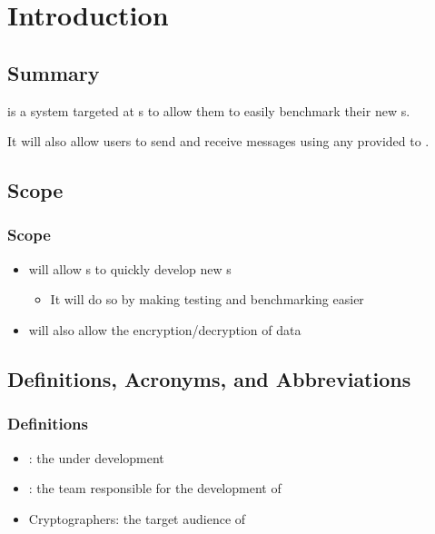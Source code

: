 
\section{Introduction}


\subsection{Summary}

\begin{frame}
  \cry{} is a system targeted at \cg s to allow them to
  easily benchmark their new \cs{} s.

  It will also allow users to send and receive messages
  using any \cs{} provided to \cry{}.
\end{frame}


\subsection{Scope}

\begin{frame}
\frametitle{Scope}
\begin{itemize}
\item \cry{} will allow \cg s to quickly develop new \cs{}s
\begin{itemize}
  \item It will do so by making testing and benchmarking
  easier
\end{itemize}
\item \cry{} will also allow the encryption/decryption of
data
\end{itemize}
\end{frame}


\subsection{Definitions, Acronyms, and Abbreviations}

\begin{frame}
\frametitle{Definitions}
\begin{itemize}
\item \cry{}: the \cf{} under development
\item \tc{}: the team responsible for the
  development of \cry{}
\item Cryptographers: the target audience of \cry
\end{itemize}
\end{frame}

